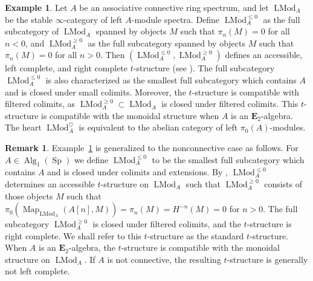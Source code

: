 \documentclass[leqno,12pt]{amsart}
\theoremstyle{plain}
\theoremstyle{definition}
\newtheorem{Remark}[Theorem]{Remark}
\newtheorem{Example}[Theorem]{Example}
\newcommand{\SP}{\operatorname{Sp}}
\newcommand{\Map}{\operatorname{Map}}
\newcommand{\Alg}{\operatorname{Alg}}
\newcommand{\etwo}{\mathbf{E}_2}
\newcommand{\LMod}{\operatorname{LMod}}
\begin{document}
\begin{Example}
\label{connectivetstr}
Let $A$ be an associative connective ring spectrum, and let $\LMod_A$ be the stable $\infty$-category of left $A$-module spectra.
Define $\LMod_A^{\le 0}$ as the full subcategory of $\LMod_A$ spanned by objects $M$ such that $\pi_n(M) = 0$ for all $n < 0$, and $\LMod_A^{\ge 0}$ as the full subcategory spanned by objects $M$ such that $\pi_n(M) = 0$ for all $n > 0$.
Then $(\LMod_A^{\le 0}, \LMod_A^{\ge 0})$ defines an accessible, left complete, and right complete $t$-structure (see \cite[7.1.1.13]{HA}).
The full subcategory $\LMod_A^{\le 0}$ is also characterized as the smallest full subcategory which contains $A$ and is closed under small colimits.
Moreover, the $t$-structure is compatible with filtered colimits, as $\LMod_A^{\ge 0} \subset \LMod_A$ is closed under filtered colimits.
This $t$-structure is compatible with the monoidal structure when $A$ is an $\etwo$-algebra.
The heart $\LMod_A^{\heartsuit}$ is equivalent to the abelian category of left $\pi_0(A)$-modules.
\end{Example}


\begin{Remark}
\label{unifiedtstr}
Example~\ref{connectivetstr} is generalized to the nonconnective case as follows.
For $A\in \Alg_1(\SP)$ we define $\LMod_A^{\le0}$ to be the smallest full subcategory
which contains $A$ and is closed under colimits and extensions. By \cite[1.4.4.11]{HA},
$\LMod_A^{\le0}$ determines an accessible $t$-structure on $\LMod_A$ such that $\LMod_A^{\ge0}$
consists of those objects $M$ such that $\pi_0(\Map_{\LMod_A}(A[n],M))=\pi_n(M)=H^{-n}(M)=0$ for $n>0$.
The full subcategory $\LMod_A^{\ge0}$ is closed under filtered colimits, and the $t$-structure is right complete.
We shall refer to this $t$-structure as the standard $t$-structure.
When $A$ is an $\etwo$-algebra, the $t$-structure is compatible with the monoidal structure on $\LMod_A$.
If $A$ is not connective, the resulting $t$-structure is generally not left complete.
\end{Remark}
\end{document}
